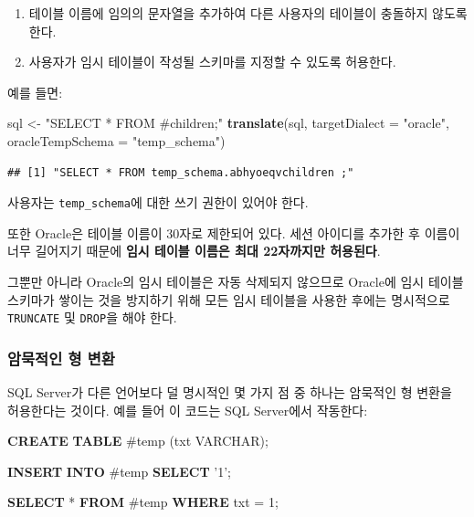 \documentclass[10.5pt]{book}
\newenvironment{Shaded}{\begin{snugshade}}{\end{snugshade}}
\newcommand{\KeywordTok}[1]{\textcolor[rgb]{0.13,0.29,0.53}{\textbf{#1}}}
\newcommand{\DataTypeTok}[1]{\textcolor[rgb]{0.13,0.29,0.53}{#1}}
\newcommand{\DecValTok}[1]{\textcolor[rgb]{0.00,0.00,0.81}{#1}}
\newcommand{\StringTok}[1]{\textcolor[rgb]{0.31,0.60,0.02}{#1}}
\newcommand{\NormalTok}[1]{#1}
\providecommand{\tightlist}{%
  \setlength{\itemsep}{0pt}\setlength{\parskip}{0pt}}
\theoremstyle{definition}
\theoremstyle{definition}
\theoremstyle{definition}
\theoremstyle{remark}
\begin{document}
\begin{enumerate}
\def\labelenumi{\arabic{enumi}.}
\tightlist
\item
  테이블 이름에 임의의 문자열을 추가하여 다른 사용자의 테이블이 충돌하지
  않도록 한다.
\item
  사용자가 임시 테이블이 작성될 스키마를 지정할 수 있도록 허용한다.
\end{enumerate}

예를 들면:

\begin{Shaded}
\begin{Highlighting}[]
\NormalTok{sql <-}\StringTok{ "SELECT * FROM #children;"}
\KeywordTok{translate}\NormalTok{(sql, }\DataTypeTok{targetDialect =} \StringTok{"oracle"}\NormalTok{, }\DataTypeTok{oracleTempSchema =} \StringTok{"temp_schema"}\NormalTok{)}
\end{Highlighting}
\end{Shaded}

\begin{verbatim}
## [1] "SELECT * FROM temp_schema.abhyoeqvchildren ;"
\end{verbatim}

사용자는 \texttt{temp\_schema}에 대한 쓰기 권한이 있어야 한다.

또한 Oracle은 테이블 이름이 30자로 제한되어 있다. 세션 아이디를 추가한
후 이름이 너무 길어지기 때문에 \textbf{임시 테이블 이름은 최대
22자까지만 허용된다}.

그뿐만 아니라 Oracle의 임시 테이블은 자동 삭제되지 않으므로 Oracle에
임시 테이블 스키마가 쌓이는 것을 방지하기 위해 모든 임시 테이블을 사용한
후에는 명시적으로 \texttt{TRUNCATE} 및 \texttt{DROP}을 해야 한다.

\subsubsection*{암묵적인 형 변환}\label{--}

SQL Server가 다른 언어보다 덜 명시적인 몇 가지 점 중 하나는 암묵적인 형
변환을 허용한다는 것이다. 예를 들어 이 코드는 SQL Server에서 작동한다:

\begin{Shaded}
\begin{Highlighting}[]
\KeywordTok{CREATE} \KeywordTok{TABLE}\NormalTok{ #temp (txt }\DataTypeTok{VARCHAR}\NormalTok{);}

\KeywordTok{INSERT} \KeywordTok{INTO}\NormalTok{ #temp}
\KeywordTok{SELECT} \StringTok{'1'}\NormalTok{;}

\KeywordTok{SELECT}\NormalTok{ * }\KeywordTok{FROM}\NormalTok{ #temp }\KeywordTok{WHERE}\NormalTok{ txt = }\DecValTok{1}\NormalTok{;}
\end{Highlighting}
\end{Shaded}
\end{document}
